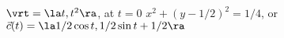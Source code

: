 {$\vrt = \la t,t^2\ra$, at $t=0$
}
{$x^2+(y-1/2)^2 = 1/4$, or $\vec c(t) = \la 1/2\cos t, 1/2\sin t+ 1/2\ra$ 
}